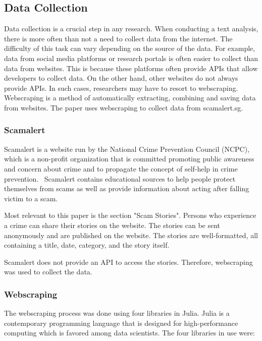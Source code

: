 \subsection{Data Collection}

Data collection is a crucial step in any research. When conducting a text analysis, there is more often than not a need to collect data from the internet. The difficulty of this task can vary depending on the source of the data. For example, data from social media platforms or research portals is often easier to collect than data from websites. This is because these platforms often provide APIs that allow developers to collect data. On the other hand, other websites do not always provide APIs. In such cases, researchers may have to resort to webscraping. Webscraping is a method of automatically extracting, combining and saving data from websites. The paper uses webscraping to collect data from scamalert.sg.

\subsubsection{Scamalert}

Scamalert is a website run by the National Crime Prevention Council (NCPC), which is a non-profit organization that is committed promoting public awareness and concern about crime and to propagate the concept of self-help in crime prevention.~\citep{ncpc} Scamalert contains educational sources to help people protect themselves from scams as well as provide information about acting after falling victim to a scam.

Most relevant to this paper is the section "Scam Stories". Persons who experience a crime can share their stories on the website. The stories can be sent anonymously and are published on the website. The stories are well-formatted, all containing a title, date, category, and the story itself.

Scamalert does not provide an API to access the stories. Therefore, webscraping was used to collect the data. 

\subsubsection{Webscraping}

The webscraping process was done using four libraries in Julia. Julia is a contemporary programming language that is designed for high-performance computing which is favored among data scientists. %
The four libraries in use were:

